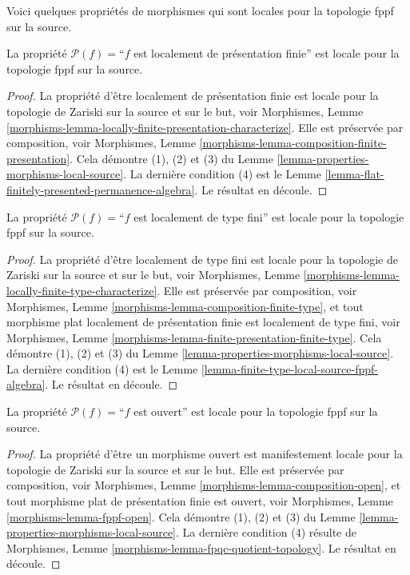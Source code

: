 \noindent
Voici quelques propriétés de morphismes qui sont locales pour la topologie
fppf sur la source.

\begin{lemma}
\label{lemma-locally-finite-presentation-fppf-local-source}
La propriété $\mathcal{P}(f)=$``$f$ est localement de présentation finie''
est locale pour la topologie fppf sur la source.
\end{lemma}

\begin{proof}
La propriété d'être localement de présentation finie est locale pour la
topologie de Zariski sur la source et sur le but, voir
Morphismes,
Lemme \ref{morphisms-lemma-locally-finite-presentation-characterize}.
Elle est préservée par composition, voir
Morphismes, Lemme \ref{morphisms-lemma-composition-finite-presentation}.
Cela démontre (1), (2) et (3) du
Lemme \ref{lemma-properties-morphisms-local-source}.
La dernière condition (4) est le
Lemme \ref{lemma-flat-finitely-presented-permanence-algebra}.
Le résultat en découle.
\end{proof}

\begin{lemma}
\label{lemma-locally-finite-type-fppf-local-source}
La propriété $\mathcal{P}(f)=$``$f$ est localement de type fini''
est locale pour la topologie fppf sur la source.
\end{lemma}

\begin{proof}
La propriété d'être localement de type fini est locale pour la topologie de
Zariski sur la source et sur le but, voir
Morphismes, Lemme \ref{morphisms-lemma-locally-finite-type-characterize}.
Elle est préservée par composition, voir
Morphismes, Lemme \ref{morphisms-lemma-composition-finite-type},
et tout morphisme plat localement de présentation finie est localement de type
fini, voir
Morphismes, Lemme \ref{morphisms-lemma-finite-presentation-finite-type}.
Cela démontre (1), (2) et (3) du
Lemme \ref{lemma-properties-morphisms-local-source}.
La dernière condition (4) est le
Lemme \ref{lemma-finite-type-local-source-fppf-algebra}.
Le résultat en découle.
\end{proof}

\begin{lemma}
\label{lemma-open-fppf-local-source}
La propriété $\mathcal{P}(f)=$``$f$ est ouvert''
est locale pour la topologie fppf sur la source.
\end{lemma}

\begin{proof}
La propriété d'être un morphisme ouvert est manifestement locale pour la
topologie de Zariski sur la source et sur le but.
Elle est préservée par composition, voir
Morphismes, Lemme \ref{morphisms-lemma-composition-open},
et tout morphisme plat de présentation finie est ouvert, voir
Morphismes, Lemme \ref{morphisms-lemma-fppf-open}.
Cela démontre (1), (2) et (3) du
Lemme \ref{lemma-properties-morphisms-local-source}.
La dernière condition (4) résulte de
Morphismes, Lemme \ref{morphisms-lemma-fpqc-quotient-topology}.
Le résultat en découle.
\end{proof}

